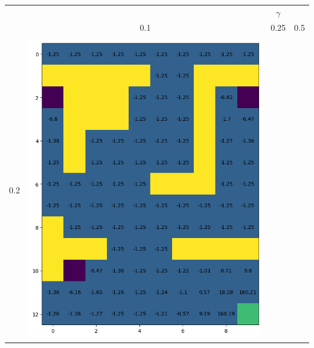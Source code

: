\begin{landscape}
\begin{center}
\begin{tabular}{c || c  c  c}
    \end{tabular}        
\end{center}

\begin{center}
    \begin{tabular}{c || c  c  c}
        & & $\gamma$ & \\
        & 0.1 & 0.25 & 0.5 \\
        \hline \hline \\
        0.2 & 
            \includegraphics[width=0.35\textheight]{assets/dp/analysis/prob_0.1_gamma_0.2_value.png}
        & 

\end{tabular}
\end{center}
\end{landscape}
